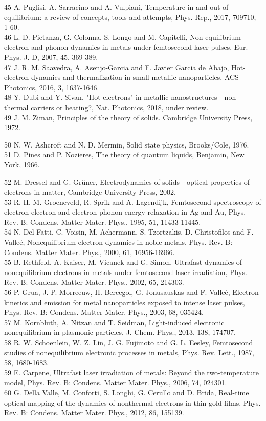 \documentclass[10pt]{article}
\begin{document}
45 A. Puglisi, A. Sarracino and A. Vulpiani, Temperature in and out of equilibrium: a review of concepts, tools and attempts, Phys. Rep., 2017, 709710, 1-60.\\
46 L. D. Pietanza, G. Colonna, S. Longo and M. Capitelli, Non-equilibrium electron and phonon dynamics in metals under femtosecond laser pulses, Eur. Phys. J. D, 2007, 45, 369-389.\\
47 J. R. M. Saavedra, A. Asenjo-Garcia and F. Javier Garcia de Abajo, Hot-electron dynamics and thermalization in small metallic nanoparticles, ACS Photonics, 2016, 3, 1637-1646.\\
48 Y. Dubi and Y. Sivan, "Hot electrons" in metallic nanostructures - non-thermal carriers or heating?, Nat. Photonics, 2018, under review.\\
49 J. M. Ziman, Principles of the theory of solids. Cambridge University Press, 1972.

50 N. W. Ashcroft and N. D. Mermin, Solid state physics, Brooks/Cole, 1976.\\
51 D. Pines and P. Nozieres, The theory of quantum liquids, Benjamin, New York, 1966.

52 M. Dressel and G. Grüner, Electrodynamics of solids - optical properties of electrons in matter, Cambridge University Press, 2002.\\
53 R. H. M. Groeneveld, R. Sprik and A. Lagendijk, Femtosecond spectroscopy of electron-electron and electron-phonon energy relaxation in Ag and Au, Phys. Rev. B: Condens. Matter Mater. Phys., 1995, 51, 11433-11445.\\
54 N. Del Fatti, C. Voisin, M. Achermann, S. Tzortzakis, D. Christofilos and F. Valleé, Nonequilibrium electron dynamics in noble metals, Phys. Rev. B: Condens. Matter Mater. Phys., 2000, 61, 16956-16966.\\
55 B. Rethfeld, A. Kaiser, M. Vicanek and G. Simon, Ultrafast dynamics of nonequilibrium electrons in metals under femtosecond laser irradiation, Phys. Rev. B: Condens. Matter Mater. Phys., 2002, 65, 214303.\\
56 P. Grua, J. P. Morreeuw, H. Bercegol, G. Jonusauskas and F. Valleé, Electron kinetics and emission for metal nanoparticles exposed to intense laser pulses, Phys. Rev. B: Condens. Matter Mater. Phys., 2003, 68, 035424.\\
57 M. Kornbluth, A. Nitzan and T. Seidman, Light-induced electronic nonequilibrium in plasmonic particles, J. Chem. Phys., 2013, 138, 174707.\\
58 R. W. Schoenlein, W. Z. Lin, J. G. Fujimoto and G. L. Eesley, Femtosecond studies of nonequilibrium electronic processes in metals, Phys. Rev. Lett., 1987, 58, 1680-1683.\\
59 E. Carpene, Ultrafast laser irradiation of metals: Beyond the two-temperature model, Phys. Rev. B: Condens. Matter Mater. Phys., 2006, 74, 024301.\\
60 G. Della Valle, M. Conforti, S. Longhi, G. Cerullo and D. Brida, Real-time optical mapping of the dynamics of nonthermal electrons in thin gold films, Phys. Rev. B: Condens. Matter Mater. Phys., 2012, 86, 155139.
\end{document}
